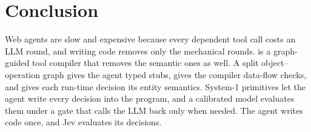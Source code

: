 \section{Conclusion}
\label{sec:conclusion}
Web agents are slow and expensive because every dependent tool call costs an LLM round, and writing code removes only the mechanical rounds. \jif is a graph-guided tool compiler that removes the semantic ones as well. A split object--operation graph gives the agent typed stubs, gives the compiler data-flow checks, and gives each run-time decision its entity semantics. System-1 primitives let the agent write every decision into the program, and a calibrated model evaluates them under a gate that calls the LLM back only when needed. The agent writes code once, and Jev evaluates its decisions. 
